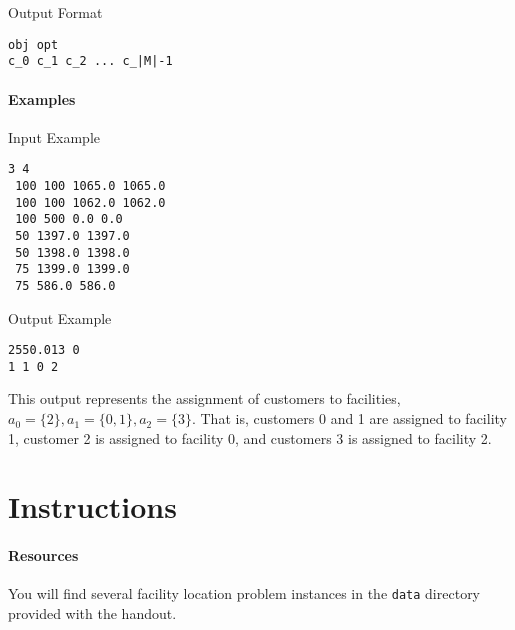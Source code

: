 \documentclass[11pt]{article}
\begin{document}
\vspace{0.2cm}
\noindent
Output Format
\vspace{-0.2cm}
\begin{Verbatim}[frame=single]
obj opt
c_0 c_1 c_2 ... c_|M|-1
\end{Verbatim}
%

\clearpage
\paragraph{Examples}

\vspace{0.2cm}
\noindent
Input Example
\vspace{-0.2cm}
\begin{Verbatim}[frame=single]
 3 4 
 100 100 1065.0 1065.0
 100 100 1062.0 1062.0 
 100 500 0.0 0.0 
 50 1397.0 1397.0
 50 1398.0 1398.0 
 75 1399.0 1399.0 
 75 586.0 586.0
\end{Verbatim}

\vspace{0.2cm}
\noindent
Output Example
\vspace{-0.2cm}
\begin{Verbatim}[frame=single]
2550.013 0
1 1 0 2
\end{Verbatim}
%
This output represents the assignment of customers to facilities, $a_0 = \{2\}, a_1 = \{0,1\}, a_2 = \{3\}$.  That is, customers 0 and 1 are assigned to facility 1, customer 2 is assigned to facility 0, and customers 3 is assigned to facility 2.

\section{Instructions}




\paragraph{Resources}
You will find several  facility location problem instances in the \texttt{data} directory provided with the handout.
\end{document}
